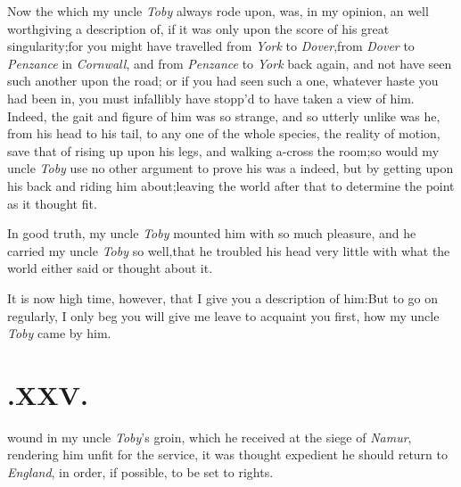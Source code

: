 \documentclass{article}
\begin{document}
Now the  which my\break
uncle \textit{Toby} always rode upon, was, in my\break
opinion, an  well worth\break giving
a description of, if it was only upon the score of his great
singularity;\break for you might have travelled from \textit{York} to
\textit{Dover},\tsk  from \textit{Dover} to \textit{Penzance} in
\textit{Cornwall}, and from \textit{Penzance} to \textit{York} back
again, and not have seen such another upon the road; or if you had seen
such a one, whatever haste you had been in, you must infallibly have
stopp’d to have taken a view of him. Indeed, the gait and figure of him
was so strange, and so utterly unlike was he, from his head to his tail,
to any one of the whole species, 
the reality of motion, save that of rising
up upon his legs, and walking a-cross the
room;\tsk  so would my uncle \textit{Toby} use 
no other argument to prove his 
 was a  indeed, 
but by getting upon his back and riding
him about;\tsk  leaving the world after that 
to determine the point as it thought fit.

In good truth, my uncle \textit{Toby} mounted him with so much
pleasure, and he carried my uncle \textit{Toby} so
well,\tsh  that he troubled his head very little with what
the world either said or thought about it.

It is now high time, however, that I give you a description of
him:\tsk  But to go on regularly, I only beg you will give me
leave to acquaint you first, how my uncle \textit{Toby} came by
him.

\null
\section{.\enspace XXV.}

 wound in my uncle \textit{Toby}’s\break
groin, which he received at the\break
siege of \textit{Namur}, rendering him unfit for 
the service, it was thought expedient he
should return to \textit{England}, in order, if\break
possible, to be set to rights.
\end{document}
